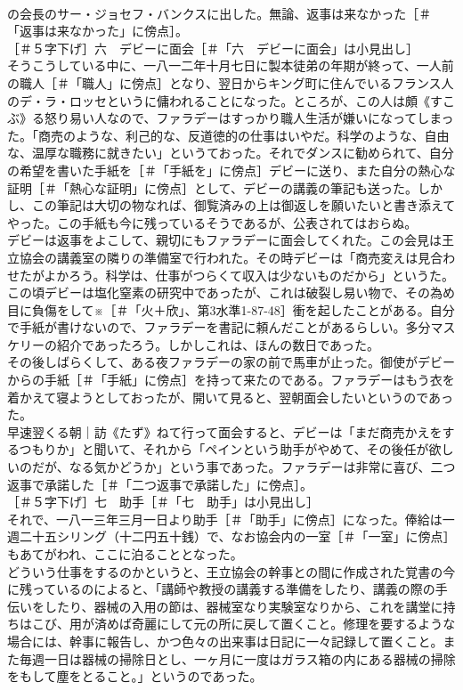 \documentclass[8pt]{extreport}
\begin{document}
\begin{CJK}{UTF8}{min}
\\	の会長のサー・ジョセフ・バンクスに出した。無論、返事は来なかった［＃「返事は来なかった」に傍点］。
\\	［＃５字下げ］六　デビーに面会［＃「六　デビーに面会」は小見出し］
\\	そうこうしている中に、一八一二年十月七日に製本徒弟の年期が終って、一人前の職人［＃「職人」に傍点］となり、翌日からキング町に住んでいるフランス人のデ・ラ・ロッセというに傭われることになった。ところが、この人は頗《すこぶ》る怒り易い人なので、ファラデーはすっかり職人生活が嫌いになってしまった。「商売のような、利己的な、反道徳的の仕事はいやだ。科学のような、自由な、温厚な職務に就きたい」というておった。それでダンスに勧められて、自分の希望を書いた手紙を［＃「手紙を」に傍点］デビーに送り、また自分の熱心な証明［＃「熱心な証明」に傍点］として、デビーの講義の筆記も送った。しかし、この筆記は大切の物なれば、御覧済みの上は御返しを願いたいと書き添えてやった。この手紙も今に残っているそうであるが、公表されてはおらぬ。
\\	デビーは返事をよこして、親切にもファラデーに面会してくれた。この会見は王立協会の講義室の隣りの準備室で行われた。その時デビーは「商売変えは見合わせたがよかろう。科学は、仕事がつらくて収入は少ないものだから」というた。この頃デビーは塩化窒素の研究中であったが、これは破裂し易い物で、その為め目に負傷をして※［＃「火＋欣」、第3水準1-87-48］衝を起したことがある。自分で手紙が書けないので、ファラデーを書記に頼んだことがあるらしい。多分マスケリーの紹介であったろう。しかしこれは、ほんの数日であった。
\\	その後しばらくして、ある夜ファラデーの家の前で馬車が止った。御使がデビーからの手紙［＃「手紙」に傍点］を持って来たのである。ファラデーはもう衣を着かえて寝ようとしておったが、開いて見ると、翌朝面会したいというのであった。
\\	早速翌くる朝｜訪《たず》ねて行って面会すると、デビーは「まだ商売かえをするつもりか」と聞いて、それから「ペインという助手がやめて、その後任が欲しいのだが、なる気かどうか」という事であった。ファラデーは非常に喜び、二つ返事で承諾した［＃「二つ返事で承諾した」に傍点］。
\\	［＃５字下げ］七　助手［＃「七　助手」は小見出し］
\\	それで、一八一三年三月一日より助手［＃「助手」に傍点］になった。俸給は一週二十五シリング（十二円五十銭）で、なお協会内の一室［＃「一室」に傍点］もあてがわれ、ここに泊ることとなった。
\\	どういう仕事をするのかというと、王立協会の幹事との間に作成された覚書の今に残っているのによると、「講師や教授の講義する準備をしたり、講義の際の手伝いをしたり、器械の入用の節は、器械室なり実験室なりから、これを講堂に持ちはこび、用が済めば奇麗にして元の所に戻して置くこと。修理を要するような場合には、幹事に報告し、かつ色々の出来事は日記に一々記録して置くこと。また毎週一日は器械の掃除日とし、一ヶ月に一度はガラス箱の内にある器械の掃除をもして塵をとること。」というのであった。

\end{CJK}
\end{document}
